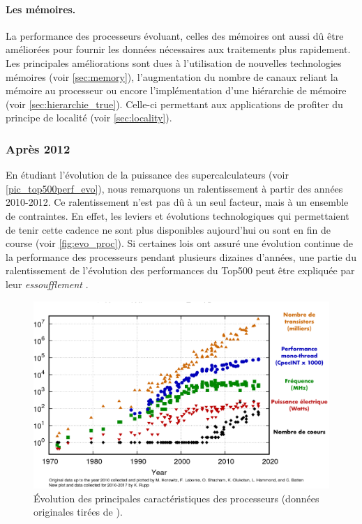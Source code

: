             \paragraph{Les mémoires.} La performance des processeurs évoluant, celles des mémoires ont aussi dû être améliorées pour fournir les données nécessaires aux traitements plus rapidement. Les principales améliorations sont dues à l'utilisation de nouvelles technologies mémoires (voir \autoref{sec:memory}), l'augmentation du nombre de canaux reliant la mémoire au processeur ou encore l'implémentation d'une hiérarchie de mémoire (voir \autoref{sec:hierarchie_true}). Celle-ci permettant aux applications de profiter du principe de localité (voir \autoref{sec:locality}).
            
        
    \subsubsection{Après 2012}
    
        En étudiant l'évolution de la puissance des supercalculateurs (voir \autoref{pic_top500perf_evo}), nous remarquons un ralentissement à partir des années 2010-2012. Ce ralentissement n'est pas dû à un seul facteur, mais à un ensemble de contraintes. En effet, les leviers et évolutions technologiques qui permettaient de tenir cette cadence ne sont plus disponibles aujourd'hui ou sont en fin de course (voir \autoref{fig:evo_proc}). Si certaines lois ont assuré une évolution continue de la performance des processeurs pendant plusieurs dizaines d'années, une partie du ralentissement de l'évolution des performances du Top500 peut être expliquée par leur \textit{essoufflement} \cite{FrancoisBodin2015}.

       
        \begin{figure}
            \center
            \includegraphics[width=12cm]{images/evo_proc.png}
            \caption{\label{fig:evo_proc} Évolution des principales caractéristiques des processeurs (données originales tirées de \cite{rupp40years}\protect\footnotemark).}
        \end{figure}
        
